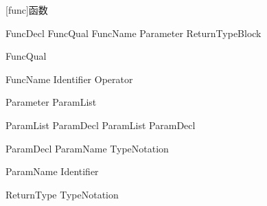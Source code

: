 
[func]{函数}

\begin{bnf}{FuncDecl}
    FuncQual\bnfs {} FuncName Parameter ReturnType\bnfq Block
\end{bnf}

\begin{bnf}{FuncQual}
     \br
\end{bnf}

\begin{bnf}{FuncName}
    Identifier \br
     \br
     \br
     Operator
\end{bnf}

\begin{bnf}{Parameter}
    \terminal{(} ParamList\bnfq \terminal{)}
\end{bnf}

\begin{bnf}{ParamList}
    ParamDecl \br
    ParamList \terminal{,} ParamDecl
\end{bnf}

\begin{bnf}{ParamDecl}
    ParamName TypeNotation\bnfq
\end{bnf}

\begin{bnf}{ParamName}
    Identifier \br
\end{bnf}

\begin{bnf}{ReturnType}
    \terminal{->} TypeNotation
\end{bnf}